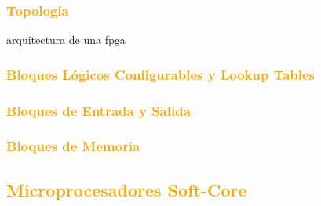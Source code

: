 \documentclass[a4paper,11pt]{article}
\begin{document}

		\subsubsection{\textcolor{orange}{Topología}}	
arquitectura de una fpga
		\subsubsection{\textcolor{orange}{Bloques Lógicos Configurables y Lookup Tables}}
		\subsubsection{\textcolor{orange}{Bloques de Entrada y Salida}}
		\subsubsection{\textcolor{orange}{Bloques de Memoria}}
	\subsection{\textcolor{orange}{Microprocesadores Soft-Core }}
\end{document}
